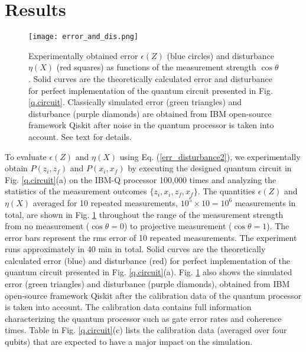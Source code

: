 \documentclass[%
reprint,
superscriptaddress,
 amsmath,amssymb,
 aps,
pra,
]{revtex4-2}
\begin{document}
\section{Results\label{sec:results}}
\begin{figure}[t] %
\centering
\texttt{[image: error\_and\_dis.png]} 
\caption{Experimentally obtained error $\epsilon(Z)$ (blue circles) and disturbance $\eta(X)$ (red squares) as functions of the measurement strength $\cos\theta$. Solid curves are the theoretically calculated error and disturbance for perfect implementation of the quantum circuit presented in Fig. \ref{q.circuit}. Classically simulated error (green triangles) and disturbance (purple diamonds) are obtained from IBM open-source framework Qiskit after noise in the quantum processor is taken into account. See text for details.} 
\label{err_dis} 
\end{figure}
To evaluate $\epsilon(Z)$ and $\eta(X)$ using Eq. (\ref{err_disturbance2}), we experimentally obtain $P(z_i, z_f)$ and $P(x_i, x_f)$ by executing the designed quantum circuit in Fig. \ref{q.circuit}(a) on the  IBM-Q processor 100,000 times and analyzing the statistics of the measurement outcomes $\{z_i, x_i, z_f, x_f\}$. The quantities $\epsilon(Z)$ and $\eta(X)$ averaged for 10 repeated measurements, $10^5\times10=10^6$ measurements in total, are shown in Fig. \ref{err_dis} throughout the range of the measurement strength from no measurement ($\cos\theta=0$) to projective measurement ($\cos\theta=1$). 
The error bars represent the rms error of 10 repeated measurements. 
The experiment runs approximately in 40 min in total.
Solid curves are the theoretically calculated error (blue) and disturbance (red) for perfect implementation of the quantum circuit presented in Fig. \ref{q.circuit}(a). 
Fig. \ref{err_dis} also shows the simulated error (green triangles) and disturbance (purple diamonds), obtained from IBM open-source framework Qiskit after the calibration data of the quantum processor is taken into account. 
The calibration data contains full information characterizing the quantum processor such as gate error rates and coherence times. 
Table in Fig. \ref{q.circuit}(c) lists the calibration data (averaged over four qubits) that are expected to have a major impact on the simulation. 
\end{document}
